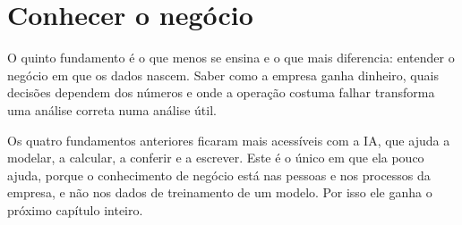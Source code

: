 \section{Conhecer o negócio}
\label{sec:fund-negocio}

O quinto fundamento é o que menos se ensina e o que mais diferencia: entender o negócio em
que os dados nascem. Saber como a empresa ganha dinheiro, quais decisões dependem dos
números e onde a operação costuma falhar transforma uma análise correta numa análise útil.

Os quatro fundamentos anteriores ficaram mais acessíveis com a IA, que ajuda a modelar, a
calcular, a conferir e a escrever. Este é o único em que ela pouco ajuda, porque o
conhecimento de negócio está nas pessoas e nos processos da empresa, e não nos dados de
treinamento de um modelo. Por isso ele ganha o próximo capítulo inteiro.

\begin{leituras}
\end{leituras}
